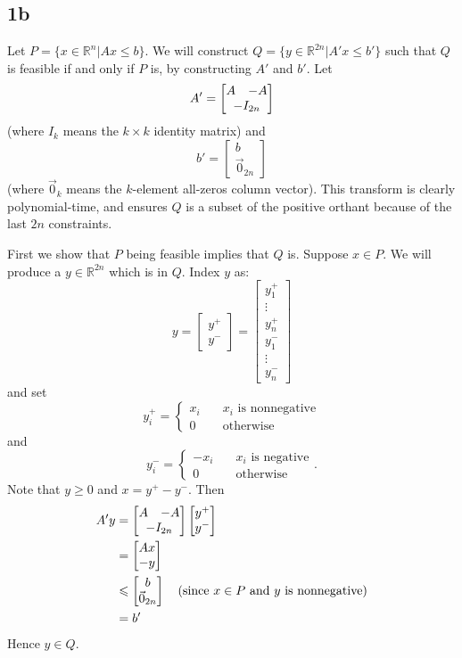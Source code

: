 \documentclass{article}
\begin{document}
\subsection*{1b}
Let $P = \{x \in \mathbb{R}^n | Ax \leqslant b\}$. We will construct $Q = \{y \in \mathbb{R}^{2n} | A'x \leqslant b'\} $ such that $Q$ is feasible if and only if $P$ is, by constructing $A'$ and $b'$. Let
\[ A' = \begin{bmatrix} A & -A \\ \multicolumn{2}{c}{-I_{2n}} \end{bmatrix}\]
(where $I_k$ means the $k \times k$ identity matrix) and
\[ b' = \begin{bmatrix} b \\ \vec0_{2n} \end{bmatrix} \] 
(where $\vec 0_k$ means the $k$-element all-zeros column vector). This transform is clearly polynomial-time, and ensures $Q$ is a subset of the positive orthant because of the last $2n$ constraints.

First we show that $P$ being feasible implies that $Q$ is. Suppose $x \in P$. We will produce a $y\in \mathbb{R}^{2n}$ which is in $Q$. Index $y$ as:
\[ y = \begin{bmatrix} y^+ \\ y^- \end{bmatrix} = \begin{bmatrix} y^+_1 \\ \vdots \\ y^+_n \\ y^-_1 \\ \vdots \\ y^-_n \end{bmatrix}\]
and set
\[y^+_i = \begin{cases} x_i & \quad \text {$x_i$ is nonnegative} \\ 0 & \quad \text {otherwise} \end{cases}\]
and
\[y^-_i = \begin{cases} -x_i & \quad \text {$x_i$ is negative} \\ 0 & \quad \text {otherwise} \end{cases}.\]
Note that $y \geqslant 0$ and $x = y^+ - y^-$. Then
\begin{align*}
A'y &= \begin{bmatrix} A & -A \\ \multicolumn{2}{c}{-I_{2n}} \end{bmatrix} \begin{bmatrix} y^+ \\ y^- \end{bmatrix} \\
&= \begin{bmatrix} Ax \\ -y \end{bmatrix} \\
&\leqslant \begin{bmatrix} b \\ \vec{0}_{2n} \end{bmatrix} \quad \text {(since $x \in P$ and $y$ is nonnegative)}\\
&= b'
\end{align*}
Hence $y \in Q$.
\end{document}
